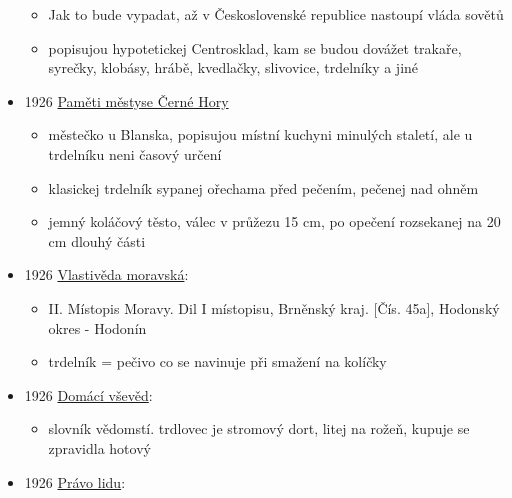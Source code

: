 \begin{itemize}
  \begin{itemize}
  \tightlist
  \item
    Jak to bude vypadat, až v Československé republice nastoupí vláda
    sovětů
  \item
    popisujou hypotetickej Centrosklad, kam se budou dovážet trakaře,
    syrečky, klobásy, hrábě, kvedlačky, slivovice, trdelníky a jiné
  \end{itemize}
\item
  1926
  \href{https://ndk.cz/view/uuid:be635380-b1b9-11ed-826c-005056827e52?page=uuid\%3A9ae6ef00-82cb-438b-8727-ef820bed7a49}{Paměti
  městyse Černé Hory}

  \begin{itemize}
  \tightlist
  \item
    městečko u Blanska, popisujou místní kuchyni minulých staletí, ale u
    trdelníku neni časový určení
  \item
    klasickej trdelník sypanej ořechama před pečením, pečenej nad ohněm
  \item
    jemný koláčový těsto, válec v průžezu 15 cm, po opečení rozsekanej
    na 20 cm dlouhý části
  \end{itemize}
\item
  1926
  \href{https://ceskadigitalniknihovna.cz/view/uuid:3ffb22b9-dde8-4a93-b4f9-7eb3f9242f73?page=uuid\%3A864331ed-50a3-11e5-8200-0050569d679d&fulltext=trdeln\%C3\%ADk\%20OR\%20trdeln\%C3\%ADky\%20OR\%20trdeln\%C3\%ADk\%C5\%AF&source=mzk}{Vlastivěda
  moravská}:

  \begin{itemize}
  \tightlist
  \item
    II. Místopis Moravy. Dil I místopisu, Brněnský kraj. {[}Čís. 45a{]},
    Hodonský okres - Hodonín
  \item
    trdelník = pečivo co se navinuje při smažení na kolíčky
  \end{itemize}
\item
  1926
  \href{https://ceskadigitalniknihovna.cz/view/uuid:42a39d90-3138-11ea-a83e-005056827e51?page=uuid\%3A0cfdfefd-f5fd-45f2-9d3e-cb5a4563b2c2&fulltext=trdlovec&source=mzk}{Domácí
  vševěd}:

  \begin{itemize}
  \tightlist
  \item
    slovník vědomstí. trdlovec je stromový dort, litej na rožeň, kupuje
    se zpravidla hotový
  \end{itemize}
\item
  1926
  \href{https://ceskadigitalniknihovna.cz/view/uuid:b91df880-8a84-11ef-bcc2-005056825209?page=uuid\%3A3da0dc0d-49de-4574-b04d-eeda66a7b25a&fulltext=trdeln\%C3\%ADk\%20OR\%20trdeln\%C3\%ADky\%20OR\%20trdeln\%C3\%ADk\%C5\%AF&source=nkp}{Právo
  lidu}:


\end{itemize}
